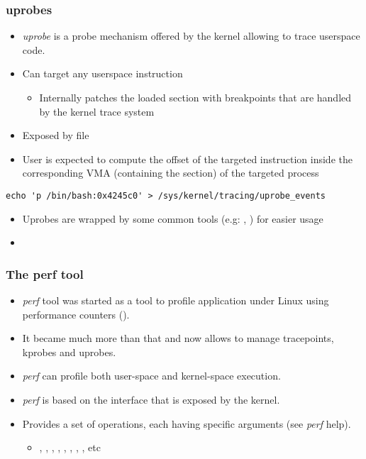 \begin{frame}[fragile]
  \frametitle{uprobes}
  \begin{itemize}
    \item {\em uprobe} is a probe mechanism offered by the kernel allowing
	    to trace userspace code.
    \item Can target any userspace instruction
    \begin{itemize}
      \item Internally patches the loaded  section with breakpoints
        that are handled by the kernel trace system
    \end{itemize}
    \item Exposed by file 
    \item User is expected to compute the offset of the targeted
	    instruction inside the corresponding VMA (containing the
	     section) of the targeted process
  \end{itemize}
  \begin{block}{}
	  \begin{verbatim}
echo 'p /bin/bash:0x4245c0' > /sys/kernel/tracing/uprobe_events
	  \end{verbatim}
  \end{block}
  \begin{itemize}
	  \item Uprobes are wrapped by some common tools (e.g:
		  , ) for easier usage
	  \item {}
  \end{itemize}
\end{frame}

\begin{frame}[fragile]
  \frametitle{The perf tool}
  \begin{itemize}
    \item {\em perf} tool was started as a tool to profile application under
          Linux using performance counters ().
    \item It became much more than that and now allows to manage tracepoints,
          kprobes and uprobes.
    \item {\em perf} can profile both user-space and kernel-space execution.
    \item {\em perf} is based on the  interface that is
          exposed by the kernel.
    \item Provides a set of operations, each having specific arguments (see
          {\em perf} help).
    \begin{itemize}
      \item {}, , , , , , , , etc
    \end{itemize}
  \end{itemize}
\end{frame}

